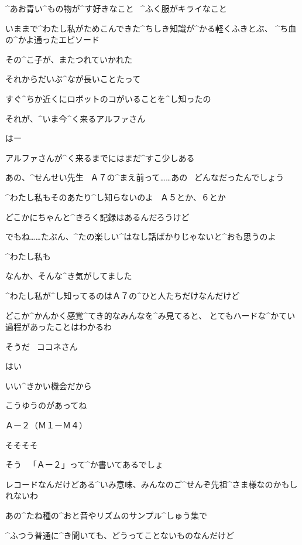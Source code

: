 \Kokone ^{あお}{青}い^{もの}{物}が^{す}{好}きなこと
\ ^{ふく}{服}がキライなこと

\Kokone いままで^{わたし}{私}がためこんできた^{ちしき}{知識}が^{かる}{軽}くふきとぶ、
^{ち}{血}の^{かよ}{通}ったエピソード

\Sensei その^{こ}{子}が、またつれていかれた

\Sensei それからだいぶ^{なが}{長}いことたって

\Sensei すぐ^{ちか}{近}くにロボットのコがいることを^{し}{知}ったの

\Sensei それが、^{いま}{今}^{く}{来}るアルファさん

\Kokone はー

\page[86]
\Kokone アルファさんが^{く}{来}るまでにはまだ^{すこ}{少}しある

\Kokone あの、^{せんせい}{先生}
\ Ａ７の^{まえ}{前}って……あの
\ どんなだったんでしょう

\Sensei ^{わたし}{私}もそのあたり^{し}{知}らないのよ
\ Ａ５とか、６とか

\Sensei どこかにちゃんと^{きろく}{記録}はあるんだろうけど

\Sensei でもね……たぶん、^{たの}{楽}しい^{はなし}{話}ばかりじゃないと^{おも}{思}うのよ

\Kokone ^{わたし}{私}も

\Kokone なんか、そんな^{き}{気}がしてました

\page[87]
\Sensei ^{わたし}{私}が^{し}{知}ってるのはＡ７の^{ひと}{人}たちだけなんだけど

\Sensei どこか^{かんかく}{感覚}^{てき}{的}なみんなを^{み}{見}てると、
とてもハードな^{かてい}{過程}があったことはわかるわ

\Sensei そうだ
\ ココネさん

\Kokone はい

\Sensei いい^{きかい}{機会}だから

\page[88]
\Sensei こうゆうのがあってね

\Sign Ａー２（Ｍ１ーＭ４）

\Kokone そそそそ

\Sensei そう
\ 「Ａー２」って^{か}{書}いてあるでしょ

\Sensei レコードなんだけどある^{いみ}{意味}、みんなのご^{せんぞ}{先祖}^{さま}{様}なのかもしれないわ

\page[89]
\Sensei あの^{たね}{種}の^{おと}{音}やリズムのサンプル^{しゅう}{集}で

\Sensei ^{ふつう}{普通}に^{き}{聞}いても、どうってことないものなんだけど

